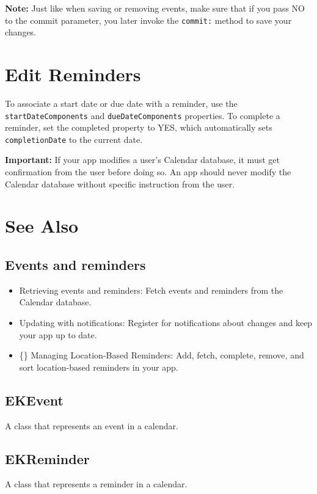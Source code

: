 \documentclass{article}
\begin{document}
\textbf{Note:} Just like when saving or removing events, make sure that if you pass NO to the commit parameter, you later invoke the \texttt{commit:} method to save your changes.

\section*{Edit Reminders}
To associate a start date or due date with a reminder, use the \texttt{startDateComponents} and \texttt{dueDateComponents} properties. To complete a reminder, set the completed property to YES, which automatically sets \texttt{completionDate} to the current date.

\textbf{Important:} If your app modifies a user's Calendar database, it must get confirmation from the user before doing so. An app should never modify the Calendar database without specific instruction from the user.

\section*{See Also}
\subsection*{Events and reminders}
\begin{itemize}
    \item Retrieving events and reminders: Fetch events and reminders from the Calendar database.
    \item Updating with notifications: Register for notifications about changes and keep your app up to date.
    \item \{\} Managing Location-Based Reminders: Add, fetch, complete, remove, and sort location-based reminders in your app.
\end{itemize}
\subsection*{EKEvent}
A class that represents an event in a calendar.
\subsection*{EKReminder}
A class that represents a reminder in a calendar.

\newpage
\end{document}
